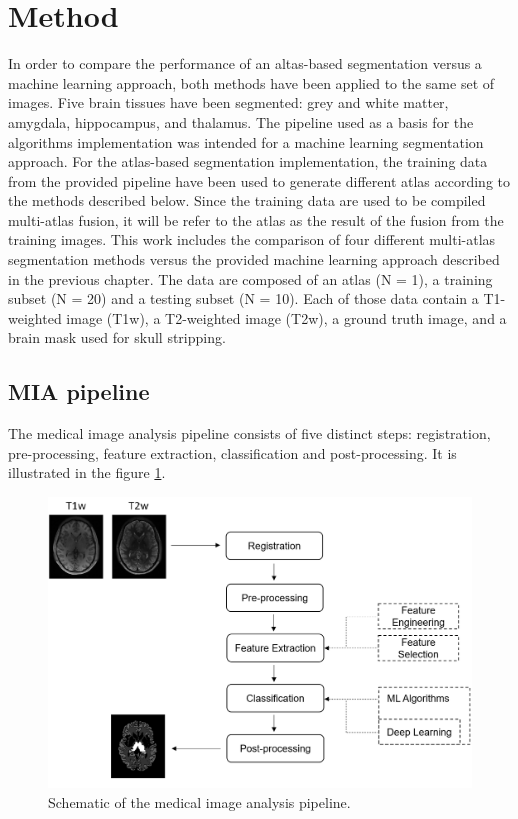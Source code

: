 \section*{Method}
In order to compare the performance of an altas-based segmentation versus a machine learning approach, both methods have been applied to the same set of images. Five brain tissues have been segmented: grey and white matter, amygdala, hippocampus, and thalamus. 
The pipeline used as a basis for the algorithms implementation was intended for a machine learning segmentation approach. For the atlas-based segmentation implementation, the training data from the provided pipeline have been used to generate different atlas according to the methods described below. Since the training data are used to be compiled multi-atlas fusion, it will be refer to the atlas as the result of the fusion from the training images. This work includes the comparison of four different multi-atlas segmentation methods versus the provided machine learning approach described in the previous chapter.
The data are composed of an atlas (N = 1), a training subset (N = 20) and a testing subset (N = 10). Each of those data contain a T1-weighted image (T1w), a T2-weighted image (T2w), a ground truth image, and a brain mask used for skull stripping.

\subsection*{MIA pipeline} \label{sec:MIApipeline}
The medical image analysis pipeline consists of five distinct steps: registration, pre-processing, feature extraction, classification and post-processing. It is illustrated in the figure \ref{fig:pipeline}.

\begin{figure}[h!]
	\centering
	\includegraphics[width = .45 \textwidth]{img/pipeline2}
	\caption{Schematic of the medical image analysis pipeline.}
	\label{fig:pipeline}
\end{figure}


